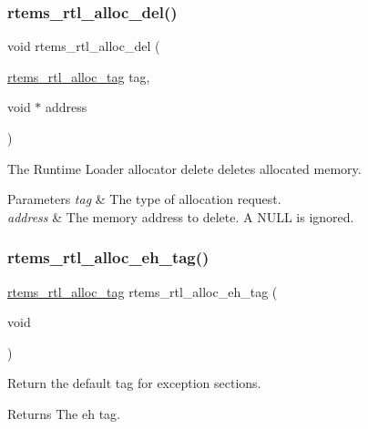 \subsubsection{\texorpdfstring{rtems\_rtl\_alloc\_del()}{rtems\_rtl\_alloc\_del()}}
{\footnotesize\ttfamily void rtems\+\_\+rtl\+\_\+alloc\+\_\+del (\begin{DoxyParamCaption}\item[{\mbox{\hyperlink{rtl-allocator_8h_a445a8615118b7fc14005ab20583153fd}{rtems\+\_\+rtl\+\_\+alloc\+\_\+tag}}}]{tag,  }\item[{void $\ast$}]{address }\end{DoxyParamCaption})}

The Runtime Loader allocator delete deletes allocated memory.


\begin{DoxyParams}{Parameters}
{\em tag} & The type of allocation request. \\
\hline
{\em address} & The memory address to delete. A N\+U\+LL is ignored. \\
\hline
\end{DoxyParams}
\mbox{\label{rtl-allocator_8c_ac03f273707eb55ed34a1ebcee8fd4a10}} 
\subsubsection{\texorpdfstring{rtems\_rtl\_alloc\_eh\_tag()}{rtems\_rtl\_alloc\_eh\_tag()}}
{\footnotesize\ttfamily \mbox{\hyperlink{rtl-allocator_8h_a445a8615118b7fc14005ab20583153fd}{rtems\+\_\+rtl\+\_\+alloc\+\_\+tag}} rtems\+\_\+rtl\+\_\+alloc\+\_\+eh\+\_\+tag (\begin{DoxyParamCaption}\item[{void}]{ }\end{DoxyParamCaption})}

Return the default tag for exception sections.

\begin{DoxyReturn}{Returns}
The eh tag. 
\end{DoxyReturn}
\mbox{\label{rtl-allocator_8c_a33521c77270f8bcfc8b5bfd61cd8ab0c}} 
